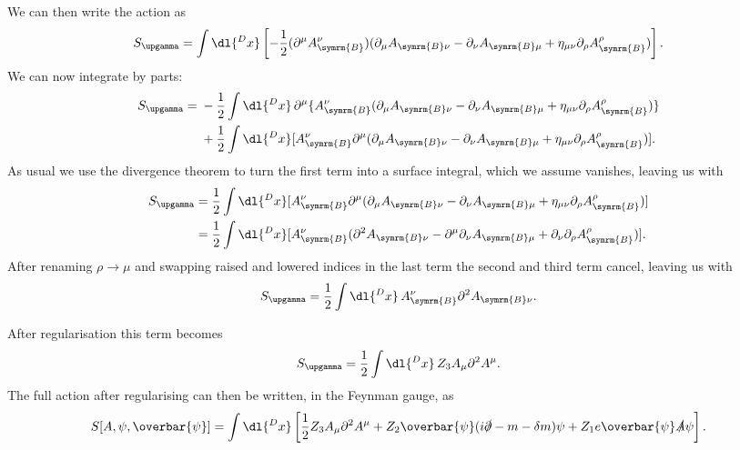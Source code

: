 \documentclass[fleqn]{NotesClass}
\newcommand{\Pphoton}{\ensuremath{\upgamma}}
\newcommand{\diracadjoint}[1]{\overbar{#1}}
\newcommand{\dalembertian}{\partial^2}
\newcommand{\bare}{\symrm{B}}
\newcommand{\minkowskiMetric}{\eta}
\begin{document}
    We can then write the action as
    \begin{equation}
        S_{\Pphoton} = \int \dl{^Dx} \left[ -\frac{1}{2}(\partial^\mu A_{\bare}^\nu)(\partial_\mu A_{\bare \nu} - \partial_\nu A_{\bare \mu} + \minkowskiMetric_{\mu\nu} \partial_\rho A_{\bare}^\rho) \right].
    \end{equation}
    We can now integrate by parts:
    \begin{align}
        S_{\Pphoton} = {} &-\frac{1}{2}\int \dl{^Dx} \, \partial^\mu \{A_{\bare}^\nu(\partial_\mu A_{\bare \nu} - \partial_\nu A_{\bare \mu} + \minkowskiMetric_{\mu\nu} \partial_\rho A_{\bare}^\rho)\} \notag\\
        &+ \frac{1}{2} \int \dl{^Dx} [A_{\bare}^\nu \partial^\mu (\partial_\mu A_{\bare \nu} - \partial_\nu A_{\bare \mu} + \minkowskiMetric_{\mu\nu} \partial_\rho A_{\bare}^\rho)].
    \end{align}
    As usual we use the divergence theorem to turn the first term into a surface integral, which we assume vanishes, leaving us with
    \begin{align}
        S_{\Pphoton} &= \frac{1}{2} \int \dl{^Dx} [A_{\bare}^\nu \partial^\mu (\partial_\mu A_{\bare \nu} - \partial_\nu A_{\bare \mu} + \minkowskiMetric_{\mu\nu} \partial_\rho A_{\bare}^\rho)]\\
        &= \frac{1}{2} \int \dl{^Dx} [A_{\bare}^\nu (\dalembertian A_{\bare \nu} - \partial^\mu \partial_\nu A_{\bare \mu} + \partial_\nu \partial_\rho A_{\bare}^\rho)].
    \end{align}
    After renaming \(\rho \to \mu\) and swapping raised and lowered indices in the last term the second and third term cancel, leaving us with
    \begin{equation}
        S_{\Pphoton} = \frac{1}{2}\int \dl{^Dx} \, A_{\bare}^\nu \dalembertian A_{\bare \nu}.
    \end{equation}
    
    After regularisation this term becomes
    \begin{equation}
        S_{\Pphoton} = \frac{1}{2} \int \dl{^D x} \, Z_3 A_\mu \dalembertian A^\mu.
    \end{equation}
    The full action after regularising can then be written, in the Feynman gauge, as
    \begin{equation}
        S[A, \psi, \diracadjoint{\psi}] = \int \dl{^Dx} \left[ \frac{1}{2}Z_3A_\mu \dalembertian A^\mu + Z_2 \diracadjoint{\psi}(i \slashed{\partial} - m - \delta m)\psi + Z_1 e\diracadjoint{\psi}\slashed{A}\psi \right].
    \end{equation}
    
\end{document}
